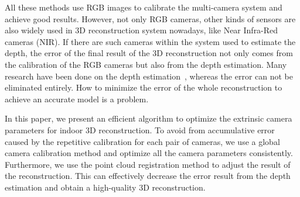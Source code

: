 \documentclass{article}
\begin{document}
All these methods use RGB images to calibrate the multi-camera system and achieve good results. However, not only RGB cameras, other kinds of sensors are also widely used in 3D reconstruction system nowadays, like Near Infra-Red cameras (NIR). If there are such cameras within the system used to estimate the depth, the error of the final result of the 3D reconstruction not only comes from the calibration of the RGB cameras but also from the depth estimation. Many research have been done on the depth estimation~\cite{scharstein,Bleyer2011PatchMatch}, whereas the error can not be eliminated entirely. How to minimize the error of the whole reconstruction to achieve an accurate model is a problem.

In this paper, we present an efficient algorithm to optimize the extrinsic camera parameters for indoor 3D reconstruction. To avoid from accumulative error caused by the repetitive calibration for each pair of cameras, we use a global camera calibration method and optimize all the camera parameters consistently. Furthermore, we use the point cloud registration method to adjust the result of the reconstruction. This can effectively decrease the error result from the depth estimation and obtain a high-quality 3D reconstruction.







\end{document}
